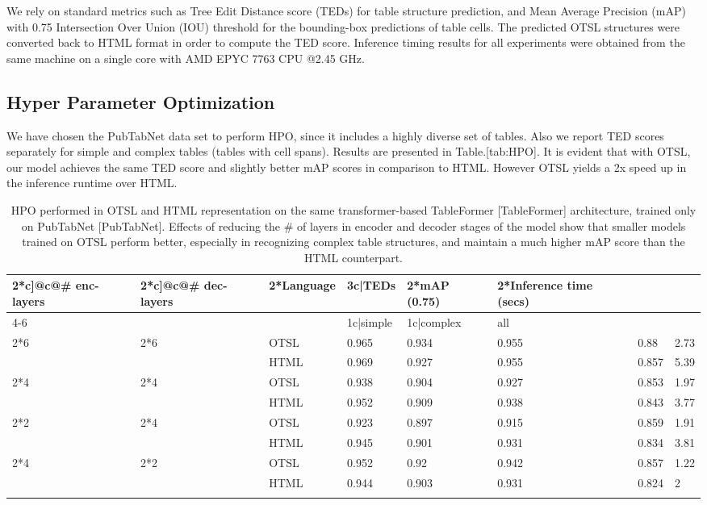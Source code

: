 \documentclass[11pt,a4paper]{article}
\begin{document}
We rely on standard metrics such as Tree Edit Distance score (TEDs) for table structure prediction, and Mean Average Precision (mAP) with 0.75 Intersection Over Union (IOU) threshold for the bounding-box predictions of table cells. The predicted OTSL structures were converted back to HTML format in order to compute the TED score. Inference timing results for all experiments were obtained from the same machine on a single core with AMD EPYC 7763 CPU @2.45 GHz.

\subsection{Hyper Parameter Optimization}

We have chosen the PubTabNet data set to perform HPO, since it includes a highly diverse set of tables. Also we report TED scores separately for simple and complex tables (tables with cell spans). Results are presented in Table.[tab:HPO]. It is evident that with OTSL, our model achieves the same TED score and slightly better mAP scores in comparison to HTML. However OTSL yields a 2x speed up in the inference runtime over HTML.

\begin{table}[h]
\caption{HPO performed in OTSL and HTML representation on the same transformer-based TableFormer [TableFormer] architecture, trained only on PubTabNet [PubTabNet]. Effects of reducing the \# of layers in encoder and decoder stages of the model show that smaller models trained on OTSL perform better, especially in recognizing complex table structures, and maintain a much higher mAP score than the HTML counterpart.}
\begin{tabular}{|l|l|l|l|l|l|l|l|}
\hline
2*c]@c@\# enc-layers & 2*c]@c@\# dec-layers & 2*Language & 3c|TEDs & 2*mAP (0.75) & 2*Inference time (secs) &  &  \\ \hline
4-6 &  &  & 1c|simple & 1c|complex & all &  &  \\ \hline
2*6 & 2*6 & OTSL & 0.965 & 0.934 & 0.955 & 0.88 & 2.73 \\ \hline
 &  & HTML & 0.969 & 0.927 & 0.955 & 0.857 & 5.39 \\ \hline
2*4 & 2*4 & OTSL & 0.938 & 0.904 & 0.927 & 0.853 & 1.97 \\ \hline
 &  & HTML & 0.952 & 0.909 & 0.938 & 0.843 & 3.77 \\ \hline
2*2 & 2*4 & OTSL & 0.923 & 0.897 & 0.915 & 0.859 & 1.91 \\ \hline
 &  & HTML & 0.945 & 0.901 & 0.931 & 0.834 & 3.81 \\ \hline
2*4 & 2*2 & OTSL & 0.952 & 0.92 & 0.942 & 0.857 & 1.22 \\ \hline
 &  & HTML & 0.944 & 0.903 & 0.931 & 0.824 & 2 \\ \hline
 &  &  &  &  &  &  &  \\ \hline
\end{tabular}
\end{table}
\end{document}
